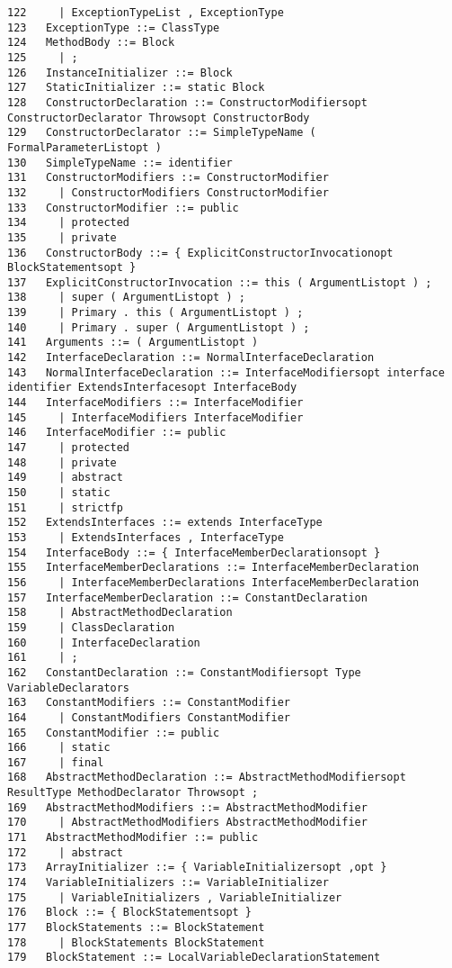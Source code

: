{\begin{verbatim}
122     | ExceptionTypeList , ExceptionType
123   ExceptionType ::= ClassType
124   MethodBody ::= Block
125     | ;
126   InstanceInitializer ::= Block
127   StaticInitializer ::= static Block
128   ConstructorDeclaration ::= ConstructorModifiersopt ConstructorDeclarator Throwsopt ConstructorBody
129   ConstructorDeclarator ::= SimpleTypeName ( FormalParameterListopt )
130   SimpleTypeName ::= identifier
131   ConstructorModifiers ::= ConstructorModifier
132     | ConstructorModifiers ConstructorModifier
133   ConstructorModifier ::= public
134     | protected
135     | private
136   ConstructorBody ::= { ExplicitConstructorInvocationopt BlockStatementsopt }
137   ExplicitConstructorInvocation ::= this ( ArgumentListopt ) ;
138     | super ( ArgumentListopt ) ;
139     | Primary . this ( ArgumentListopt ) ;
140     | Primary . super ( ArgumentListopt ) ;
141   Arguments ::= ( ArgumentListopt )
142   InterfaceDeclaration ::= NormalInterfaceDeclaration
143   NormalInterfaceDeclaration ::= InterfaceModifiersopt interface identifier ExtendsInterfacesopt InterfaceBody
144   InterfaceModifiers ::= InterfaceModifier
145     | InterfaceModifiers InterfaceModifier
146   InterfaceModifier ::= public
147     | protected
148     | private
149     | abstract
150     | static
151     | strictfp
152   ExtendsInterfaces ::= extends InterfaceType
153     | ExtendsInterfaces , InterfaceType
154   InterfaceBody ::= { InterfaceMemberDeclarationsopt }
155   InterfaceMemberDeclarations ::= InterfaceMemberDeclaration
156     | InterfaceMemberDeclarations InterfaceMemberDeclaration
157   InterfaceMemberDeclaration ::= ConstantDeclaration
158     | AbstractMethodDeclaration
159     | ClassDeclaration
160     | InterfaceDeclaration
161     | ;
162   ConstantDeclaration ::= ConstantModifiersopt Type VariableDeclarators
163   ConstantModifiers ::= ConstantModifier
164     | ConstantModifiers ConstantModifier
165   ConstantModifier ::= public
166     | static
167     | final
168   AbstractMethodDeclaration ::= AbstractMethodModifiersopt ResultType MethodDeclarator Throwsopt ;
169   AbstractMethodModifiers ::= AbstractMethodModifier
170     | AbstractMethodModifiers AbstractMethodModifier
171   AbstractMethodModifier ::= public
172     | abstract
173   ArrayInitializer ::= { VariableInitializersopt ,opt }
174   VariableInitializers ::= VariableInitializer
175     | VariableInitializers , VariableInitializer
176   Block ::= { BlockStatementsopt }
177   BlockStatements ::= BlockStatement
178     | BlockStatements BlockStatement
179   BlockStatement ::= LocalVariableDeclarationStatement

\end{verbatim}}
